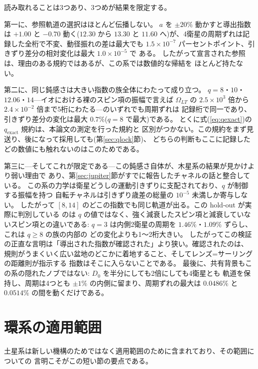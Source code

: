 \documentclass[a4paper,10pt,twocolumn]{ltjsarticle}
\begin{document}
読み取れることは3つあり、3つめが結果を限定する。

第一に、参照軌道の選択はほとんど伝播しない。
$a$ を $\pm20\%$ 動かすと導出指数は $+1.00$ と $-0.70$ 動く($12.30$ から $13.30$ と
$11.60$ へ)が、4衛星の周期ずれは記録した全桁で不変、動径振れの差は最大でも
$1.5\times10^{-7}$ パーセントポイント、引きずり差分の相対変化は最大 $1.0\times10^{-5}$ で
ある。
したがって宣言された参照は、理由のある規約ではあるが、この系では数値的な帰結を
ほとんど持たない。

第二に、同じ鈍感さは大きい指数の族全体にわたって成り立つ。
$q=8$・$10$・$12.06$・$14$---イオにおける裸のスピン項の振幅で言えば $\Omega_{LT}$ の
$2.5\times10^{3}$ 倍から $2.4\times10^{-2}$ 倍まで5桁にわたる---のいずれでも周期ずれは
記録桁で同一であり、引きずり差分の変化は最大 $0.7\%$($q=8$ で最大)である。
とくに式(\ref{eq:qexact})の $q_{\mathrm{exact}}$ 規約は、本論文の測定を行った規約と
区別がつかない。この規約をまず見送り、後になって採用しても(第\ref{sec:qlock}節)、
どちらの判断もここに記録したどの数値にも触れないのはこのためである。

第三に---そしてこれが限定である---この鈍感さ自体が、木星系の結果が見かけより弱い理由で
あり、第\ref{sec:jupiter}節がすでに報告したチャネルの話と整合している。
この系の力学は衛星どうしの運動引きずりに支配されており、$q$ が制御する振幅を持つ
自転チャネルは引きずり歳差の総量の $10^{-5}$ 未満しか寄与しない。
したがって $[8,14]$ のどこの指数でも同じ軌道が出る。この hold-out が実際に判別している
のは $q$ の値ではなく、強く減衰したスピン項と減衰していないスピン項との違いである:
$q=3$ は内側2衛星の周期を $1.46\%$・$1.09\%$ ずらし、これは $q\geq8$ の族の内部の
どの変化よりも1〜2桁大きい。
したがってこの検証の正直な言明は「導出された指数が確認された」より狭い。確認されたのは、
規則がうまくいく広い盆地のどこかに着地すること、そしてレンズ=サーリングの距離則が指示する
指数はそこに入らないことである。
最後に、共有背景もこの系の隠れたノブではない: $D_0$ を半分にしても2倍にしても4衛星とも
軌道を保持し、周期は4つとも $\pm1\%$ の内側に留まり、周期ずれの最大は $0.0486\%$ と
$0.0514\%$ の間を動くだけである。

\section{環系の適用範囲}
\label{sec:ring}

土星系は新しい機構のためではなく適用範囲のために含まれており、その範囲についての
言明こそがこの短い節の要点である。
\end{document}
